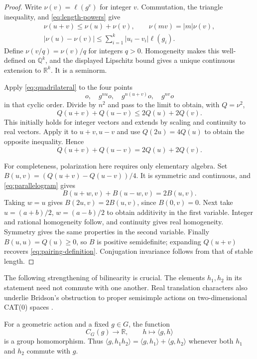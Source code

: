 \begin{proof}
Write $\nu(v)=\ell(g^v)$ for integer $v$.  Commutation, the triangle
inequality, and \eqref{eq:length-powers} give
\begin{gather*}
 \nu(u+v)\le\nu(u)+\nu(v),\qquad
 \nu(mv)=|m|\nu(v),\\
 |\nu(u)-\nu(v)|\le\sum_{i=1}^k|u_i-v_i|\ell(g_i).
\end{gather*}
Define $\nu(v/q)=\nu(v)/q$ for integers $q>0$.  Homogeneity makes this
well-defined on $\mathbb Q^k$, and the displayed Lipschitz bound gives a
unique continuous extension to $\mathbb R^k$.  It is a seminorm.

Apply \eqref{eq:quadrilateral} to the four points
\[
 o,\quad g^{nu}o,\quad g^{n(u+v)}o,\quad g^{nv}o
\]
in that cyclic order.  Divide by $n^2$ and pass to the limit to obtain,
with $Q=\nu^2$,
\[
 Q(u+v)+Q(u-v)\le 2Q(u)+2Q(v).
\]
This initially holds for integer vectors and extends by scaling and
continuity to real vectors.  Apply it to $u+v,u-v$ and use
$Q(2u)=4Q(u)$ to obtain the opposite inequality.  Hence
\begin{equation}\label{eq:parallelogram}
 Q(u+v)+Q(u-v)=2Q(u)+2Q(v).
\end{equation}

For completeness, polarization here requires only elementary algebra.
Set $B(u,v)=(Q(u+v)-Q(u-v))/4$.  It is symmetric and continuous, and
\eqref{eq:parallelogram} gives
\[
 B(u+w,v)+B(u-w,v)=2B(u,v).
\]
Taking $w=u$ gives $B(2u,v)=2B(u,v)$, since $B(0,v)=0$.
Next take $u=(a+b)/2$, $w=(a-b)/2$ to obtain additivity in the first
variable.  Integer and rational homogeneity follow, and continuity gives
real homogeneity.  Symmetry gives the same properties in the second
variable.  Finally $B(u,u)=Q(u)\ge0$, so $B$ is positive semidefinite;
expanding $Q(u+v)$ recovers \eqref{eq:pairing-definition}.  Conjugation
invariance follows from that of stable length.
\end{proof}

The following strengthening of bilinearity is crucial.  The elements
$h_1,h_2$ in its statement need not commute with one another.
Real translation characters also underlie Bridson's obstruction to
proper semisimple actions on two-dimensional CAT(0) spaces
\cite[Proposition~3.1]{Bridson2001}.

\begin{lemma}\label{lem:centralizer-character}
For a geometric action and a fixed $g\in G$, the function
\[
 C_G(g)\longrightarrow\mathbb R,\qquad h\longmapsto\langle g,h\rangle
\]
is a group homomorphism.  Thus
$\langle g,h_1h_2\rangle=\langle g,h_1\rangle+\langle g,h_2\rangle$
whenever both $h_1$ and $h_2$ commute with $g$.
\end{lemma}


